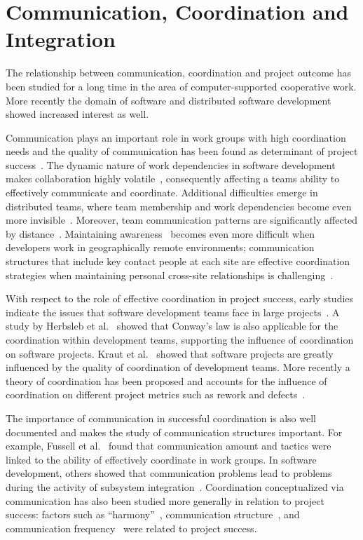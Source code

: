 \section{Communication, Coordination and Integration}
\label{sec:RelatedCommunication}

The relationship between communication, coordination and project outcome has been
studied for a long time in the area of computer-supported cooperative work. More
recently the domain of software and distributed software development showed
increased interest as well.

Communication plays an important role in work groups with high coordination needs
and the quality of communication has been found as determinant of project
success~\cite{curtis:acm:1988,kraut:1995coordination}. The dynamic nature
of work dependencies in software development makes collaboration highly
volatile~\cite{Cataldo:2007hb}, consequently affecting a teams ability to
effectively communicate and coordinate. Additional difficulties emerge in
distributed teams, where team membership and work dependencies become even more
invisible~\cite{damian:icgse:2007}. Moreover, team communication patterns are
significantly affected by distance~\cite{hinds:cscw:2006}. Maintaining
awareness~\cite{sarma:2006icgse} becomes even more difficult when developers work
in geographically remote environments; communication structures that include key
contact people at each site are effective coordination strategies when
maintaining personal cross-site relationships is challenging~\cite{hinds:cscw:2006}.

With respect to the role of effective coordination in project success, early
studies indicate the issues that software development teams face in large
projects~\cite{curtis:acm:1988}. A study by Herbsleb et
al.~\cite{Herbsleb:1999ew} showed that Conway's law is also applicable for the
coordination within development teams, supporting the influence of coordination
on software projects. Kraut et al.~\cite{kraut:1995coordination} showed that
software projects are greatly influenced by the quality of coordination of
development teams. More recently a theory of coordination has been proposed and
accounts for the influence of coordination on different project metrics such as
rework and defects~\cite{Herbsleb:2006vn}.


The importance of communication in successful coordination is also well
documented and makes the study of communication structures important. For
example, Fussell et al.~\cite{fussell:cscw:1998} found that communication amount and
tactics were linked to the ability of effectively coordinate in work groups. In
software development, others showed that communication problems lead to problems
during the activity of subsystem
integration~\cite{Grinter:1999geography,deSouza2004:thwarts_collaboration}. Coordination
conceptualized via communication has also been studied more generally in relation
to project success: factors such as ``harmony''~\cite{Souder:1988jpim},
communication structure~\cite{Robin:1990jpim}, and communication
frequency~\cite{Griffin:1992ms} were related to project success.

